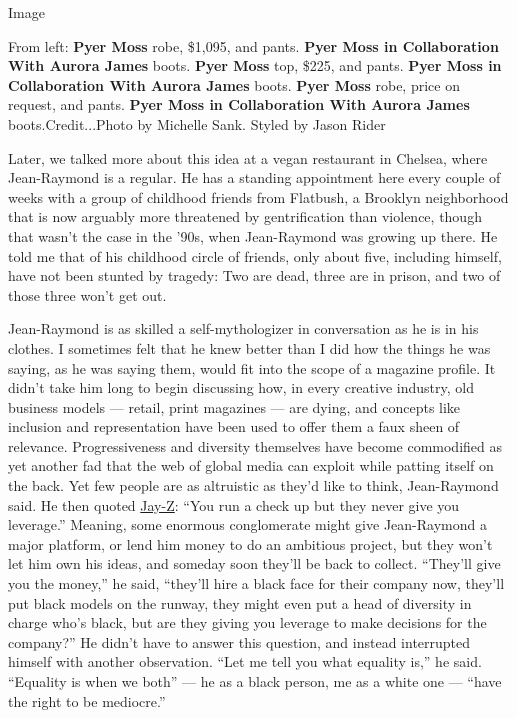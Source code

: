 Image

From left: \textbf{Pyer Moss} robe, \$1,095, and pants. \textbf{Pyer
Moss in Collaboration With Aurora James} boots. \textbf{Pyer Moss} top,
\$225, and pants. \textbf{Pyer Moss in Collaboration With Aurora James}
boots. \textbf{Pyer Moss} robe, price on request, and pants.
\textbf{Pyer Moss in Collaboration With Aurora James}
boots.Credit...Photo by Michelle Sank. Styled by Jason Rider

Later, we talked more about this idea at a vegan restaurant in Chelsea,
where Jean-Raymond is a regular. He has a standing appointment here
every couple of weeks with a group of childhood friends from Flatbush, a
Brooklyn neighborhood that is now arguably more threatened by
gentrification than violence, though that wasn't the case in the '90s,
when Jean-Raymond was growing up there. He told me that of his childhood
circle of friends, only about five, including himself, have not been
stunted by tragedy: Two are dead, three are in prison, and two of those
three won't get out.

Jean-Raymond is as skilled a self-mythologizer in conversation as he is
in his clothes. I sometimes felt that he knew better than I did how the
things he was saying, as he was saying them, would fit into the scope of
a magazine profile. It didn't take him long to begin discussing how, in
every creative industry, old business models --- retail, print magazines
--- are dying, and concepts like inclusion and representation have been
used to offer them a faux sheen of relevance. Progressiveness and
diversity themselves have become commodified as yet another fad that the
web of global media can exploit while patting itself on the back. Yet
few people are as altruistic as they'd like to think, Jean-Raymond said.
He then quoted
\href{https://www.nytimes3xbfgragh.onion/interactive/2017/11/29/t-magazine/jay-z-dean-baquet-interview.html}{Jay-Z}:
``You run a check up but they never give you leverage.'' Meaning, some
enormous conglomerate might give Jean-Raymond a major platform, or lend
him money to do an ambitious project, but they won't let him own his
ideas, and someday soon they'll be back to collect. ``They'll give you
the money,'' he said, ``they'll hire a black face for their company now,
they'll put black models on the runway, they might even put a head of
diversity in charge who's black, but are they giving you leverage to
make decisions for the company?'' He didn't have to answer this
question, and instead interrupted himself with another observation.
``Let me tell you what equality is,'' he said. ``Equality is when we
both'' --- he as a black person, me as a white one --- ``have the right
to be mediocre.''

